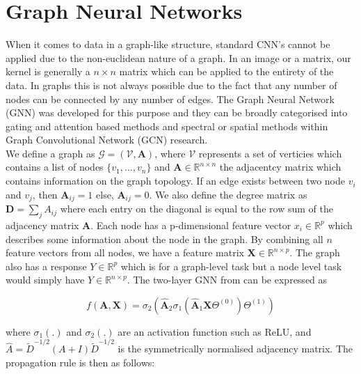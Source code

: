 \documentclass[honours,12pt]{unswthesis}
\numberwithin{equation}{section}
\begin{document}
\section{Graph Neural Networks}\label{gnn}
When it comes to data in a graph-like structure, standard CNN's cannot be applied due to the non-euclidean nature of a graph.
In an image or a matrix, our kernel is generally a $n\times n$ matrix which can be applied to the entirety of the data. In graphs
this is not always possible due to the fact that any number of nodes can be connected by any number of edges.\cite{sanchez-lengeling2021a} 
The Graph Neural Network (GNN) was developed for this purpose and they can be broadly categorised into gating and attention based methods\cite{veličković2018graph} 
and spectral or spatial methods within Graph Convolutional Network (GCN) research.\cite{kipf2017semisupervised} \\

{\noindent}We define a graph as ${\mathcal{G}} = ({\mathcal{V}}, \textbf{A})$, where $\mathcal{V}$ represents a set of verticies which contains a list of nodes
$\{ v_1, \dots, v_n \}$ and $\textbf{A} \in \mathbb{R}^{n \times n}$ the adjacentcy matrix which contains information on the graph topology. 
If an edge exists between two node $v_i$ and $v_j$, then $\textbf{A}_{ij} = 1$ else, $\textbf{A}_{ij} = 0$. 
We also define the degree matrix as $\mathbf{D} = \sum_{j}A_{ij}$ where each entry on the diagonal is equal to the row sum of the adjacency matrix $\textbf{A}$.  
Each node has a {p}-dimensional feature vector ${x_i} \in \mathbb{R}^{p}$ which describes some information about the node in the graph. 
By combining all ${n}$ feature vectors from all nodes, we have a feature matrix $\textbf{X} \in \mathbb{R}^{n\times p}$. 
The graph also has a response ${Y} \in \mathbb{R}^p$ which is for a graph-level task but a node level task would simply have ${Y} \in \mathbb{R}^{n\times p}$.
The two-layer GNN from\cite{kipf2017semisupervised} can be expressed as

\begin{equation}
f(\mathbf{A, X}) = \sigma_2( \mathbf{ \hat{A} }_2 \sigma_1 (\mathbf{ \hat{A} }_1 \mathbf{X} \Theta^{(0)}) \Theta^{(1)})
\end{equation}

\noindent where $\sigma_1(.)$ and $\sigma_2(.)$ are an activation function such as ReLU, and $\hat{A} = \tilde{D}^{-1/2} (A + I) \tilde{D}^{-1/2}$
is the symmetrically normalised adjacency matrix. The propagation rule is then as follows:
\end{document}
